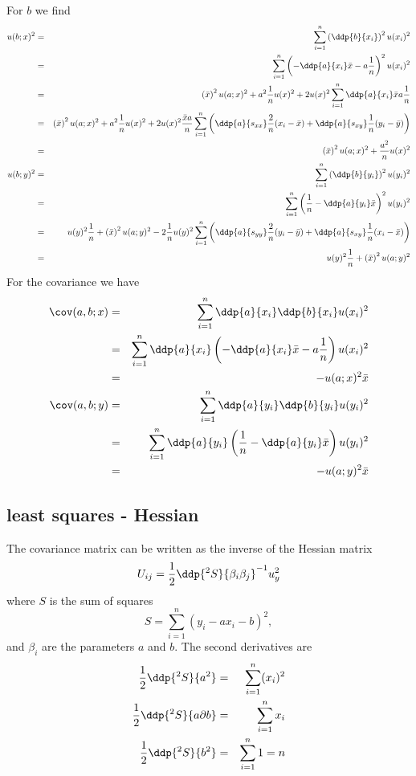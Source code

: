 For $b$ we find
\begin{eqnarray*}
 u(b;x)^2 &=& \sum_{i=1}^n \left(\ddp{b}{x_i}\right)^2 u(x_i)^2 \\
 &=& \sum_{i=1}^n \left( - \ddp{a}{x_i} \bar x - a \frac1n \right)^2 u(x_i)^2 \\
 &=& \left(\bar x\right)^2 u(a;x)^2 + a^2 \frac1n u(x)^2 + 2 u(x)^2 \sum_{i=1}^n \ddp{a}{x_i} \bar x a \frac1n \\
 &=& \left(\bar x\right)^2 u(a;x)^2 + a^2 \frac1n u(x)^2 + 2 u(x)^2 \frac{\bar x a}n \sum_{i=1}^n \left(  \ddp{a}{s_{xx}}  \frac2{n} (x_i - \bar x) + \ddp{a}{s_{xy}} \frac1n (y_i - \bar y)\right) \\
 &=& \left(\bar x\right)^2 u(a;x)^2 + \frac{a^2}n u(x)^2 \\
 u(b;y)^2 &=& \sum_{i=1}^n \left(\ddp{b}{y_i}\right)^2 u(y_i)^2 \\
 &=& \sum_{i=1}^n \left(\frac1n - \ddp{a}{y_i} \bar x\right)^2 u(y_i)^2 \\
 &=& u(y)^2 \frac1n + \left(\bar x \right)^2 u(a;y)^2 - 2 \frac1n u(y)^2 \sum_{i=1}^n \left(  \ddp{a}{s_{yy}}  \frac2{n} (y_i - \bar y) + \ddp{a}{s_{xy}} \frac1n (x_i - \bar x)\right) \\ 
 &=& u(y)^2 \frac1n + \left(\bar x \right)^2 u(a;y)^2
\end{eqnarray*}
For the covariance we have
\begin{eqnarray*}
 \cov(a,b;x) &=& \sum_{i=1}^n \ddp{a}{x_i} \ddp{b}{x_i} u(x_i)^2 \\
  &=&  \sum_{i=1}^n \ddp{a}{x_i}\left( - \ddp{a}{x_i} \bar x - a \frac1n \right) u(x_i)^2 \\
  &=& - u(a;x)^2 \bar x \\
 \cov(a,b;y) &=& \sum_{i=1}^n \ddp{a}{y_i} \ddp{b}{y_i} u(y_i)^2 \\
  &=&  \sum_{i=1}^n \ddp{a}{y_i}\left( \frac1n - \ddp{a}{y_i} \bar x \right) u(y_i)^2 \\
  &=& -u(a;y)^2\bar x
\end{eqnarray*}

\subsection{least squares - Hessian}
The covariance matrix can be written as the inverse of the Hessian matrix
\begin{equation}
 U_{ij} = \frac12 \ddp{^2S}{\beta_i \beta_j}^{-1} u_y^2
\end{equation}
where $S$ is the sum of squares
\begin{equation*}
 S = \sum_{i=1}^n (y_i - a x_i - b)^2,
\end{equation*} 
and $\beta_i$ are the parameters $a$ and $b$.
The second derivatives are 
\begin{eqnarray*}
 \frac12 \ddp{^2S}{a^2} &=& \sum_{i=1}^n  (x_i )^2 \\
 \frac12 \ddp{^2S}{a \partial b} &=& \sum_{i=1}^n  x_i  \\
 \frac12 \ddp{^2 S} {b^2} &=& \sum_{i=1}^n 1 = n  \\
  \end{eqnarray*}
  
